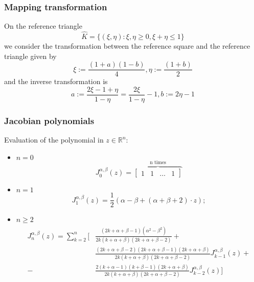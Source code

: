 \documentclass[a4paper]{article}
\begin{document}
\subsubsection{Mapping transformation}
	On the reference triangle
	\begin{equation}
	\hat{K}=\{ (\xi, \eta) : \xi, \eta \ge 0,	\xi+\eta \le 1 \}
	\end{equation}
	we consider the transformation between the reference square and the reference triangle given by
	\begin{equation}
	\xi:=\frac{(1+a)(1-b)}{4},  \eta:=\frac{(1+b)}{2}
	\end{equation}
	and the inverse transformation is
	\begin{equation}
	a:=\frac{2\xi-1+\eta}{1-\eta}=\frac{2\xi}{1-\eta}-1,	b:=2\eta-1
	\end{equation}

\vspace{4mm}

\subsubsection{Jacobian polynomials}

Evaluation of the polynomial in $z\in \mathbb{R}^n$:
\begin{itemize}[label=\textendash]
\item $n=0$
\begin{equation}
J_0^{\alpha,\beta}(z)=\overbrace{\begin{bmatrix} 1 & 1 &\dots &1 \end{bmatrix}}^{\text{n times}}
\end{equation}
\item $n=1$
\begin{equation}
J_1^{\alpha,\beta}(z)=\frac{1}{2}(\alpha-\beta+(\alpha+\beta+2)\cdot z);
\end{equation}
\item $n\ge2$
\newline
\begin{equation}
\begin{gathered}
\begin{aligned}
J_n^{\alpha,\beta}(z)=\sum_{k=2}^{n} \Big[&\frac{(2k+\alpha+\beta-1)(\alpha^{2}-\beta^{2})}{2k(k+\alpha+\beta)(2k+\alpha+\beta-2)}+ \\ &\frac{(2k+\alpha+\beta-2)(2k+\alpha+\beta-1)(2k+\alpha+\beta)}{2k(k+\alpha+\beta)(2k+\alpha+\beta-2)} J_{k-1}^{\alpha,\beta}(z) +
\\-&\frac{2(k+\alpha-1)(k+\beta-1)(2k+\alpha+\beta)}{2k(k+\alpha+\beta)(2k+\alpha+\beta-2)} J_{k-2}^{\alpha,\beta}(z) \Big]
\end{aligned}
\end{gathered}
\end{equation}
\end{itemize}
\end{document}
